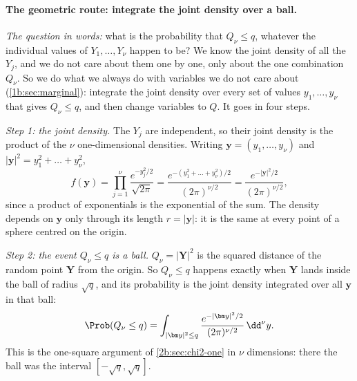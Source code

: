 \paragraph{The geometric route: integrate the joint density over a ball.} \emph{The question in words:} what is the probability that $Q_\nu\le q$, whatever the individual values of $Y_1,\dots,Y_\nu$ happen to be? We know the joint density of all the $Y_j$, and we do not care about them one by one, only about the one combination $Q_\nu$. So we do what we always do with variables we do not care about (\cref{1b:sec:marginal}): integrate the joint density over every set of values $y_1,\dots,y_\nu$ that gives $Q_\nu\le q$, and then change variables to $Q$. It goes in four steps.

\emph{Step 1: the joint density.} The $Y_j$ are independent, so their joint density is the product of the $\nu$ one-dimensional densities. Writing $\bm y=(y_1,\dots,y_\nu)$ and $|\bm y|^2=y_1^2+\dots+y_\nu^2$,
\begin{equation}
  f(\bm y)=\prod_{j=1}^{\nu}\frac{e^{-y_j^2/2}}{\sqrt{2\pi}}=\frac{e^{-(y_1^2+\dots+y_\nu^2)/2}}{(2\pi)^{\nu/2}}=\frac{e^{-|\bm y|^2/2}}{(2\pi)^{\nu/2}} ,
  \label{2b:eq:chi2-joint}
\end{equation}
since a product of exponentials is the exponential of the sum. The density depends on $\bm y$ only through its length $r=|\bm y|$: it is the same at every point of a sphere centred on the origin.

\emph{Step 2: the event $Q_\nu\le q$ is a ball.} $Q_\nu=|\bm Y|^2$ is the squared distance of the random point $\bm Y$ from the origin. So $Q_\nu\le q$ happens exactly when $\bm Y$ lands inside the ball of radius $\sqrt q$, and its probability is the joint density integrated over all $\bm y$ in that ball:
\[
  \Prob(Q_\nu\le q)=\int_{|\bm y|^2\le q}\frac{e^{-|\bm y|^2/2}}{(2\pi)^{\nu/2}}\,\dd^\nu y .
\]
This is the one-square argument of \cref{2b:sec:chi2-one} in $\nu$ dimensions: there the ball was the interval $[-\sqrt q,\sqrt q]$.

